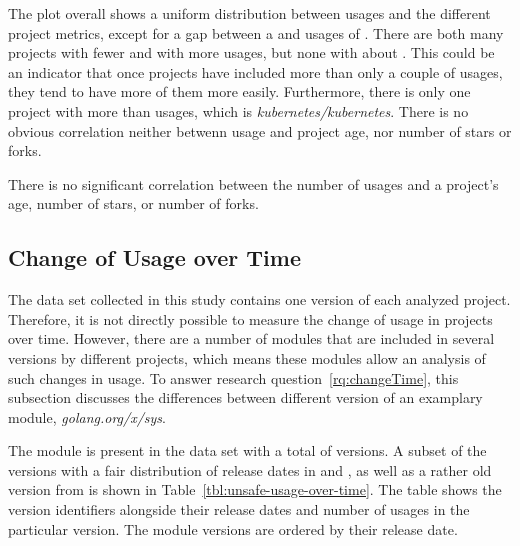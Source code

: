 

The plot overall shows a uniform distribution between \unsafe{} usages and the different project metrics, except for
a gap between a  and  usages of \unsafe{}.
There are both many projects with fewer and with more usages, but none with about .
This could be an indicator that once projects have included more than only a couple of \unsafe{} usages, they tend to
have more of them more easily.
Furthermore, there is only one project with more than  \unsafe{} usages, which is
\textit{kubernetes/kubernetes}.
There is no obvious correlation neither betwenn \unsafe{} usage and project age, nor number of stars or forks.

\begin{tcolorbox}[boxsep=3pt, enlarge top by=5pt, title=Answer to~\ref{rq:popularity}]
    There is no significant correlation between the number of \unsafe{} usages and a project's age, number of stars, or
    number of forks.
\end{tcolorbox}



\subsection{Change of Usage over Time}\label{subsec:go-geiger:evaluation:over-time}

The data set collected in this study contains one version of each analyzed project.
Therefore, it is not directly possible to measure the change of \unsafe{} usage in projects over time.
However, there are a number of modules that are included in several versions by different projects, which means these
modules allow an analysis of such changes in \unsafe{} usage.
To answer research question~\ref{rq:changeTime}, this subsection discusses the differences between different version of
an examplary module, \textit{golang.org/x/sys}.

The module is present in the data set with a total of \sysModuleVersions{} versions.
A subset of the versions with a fair distribution of release dates in  and , as well as a
rather old version from  is shown in Table~\ref{tbl:unsafe-usage-over-time}.
The table shows the version identifiers alongside their release dates and number of \unsafe{} usages in the particular
version.
The module versions are ordered by their release date.


